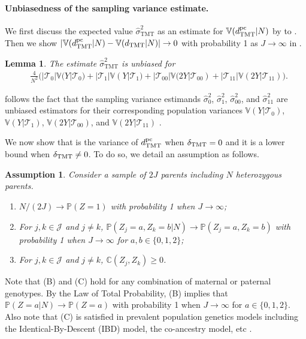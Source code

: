\documentclass[12pt]{extarticle}
\newtheorem{asm}{Assumption}%
\newtheorem{lem}{Lemma}%
\newcommand{\pp}{\mathbb{P}}
\newcommand{\nind}{J}
\newcommand{\tmt}{{\normalfont \text{TMT}}}
\newcommand{\dtmtpc}{d_{\tmt}^{\normalfont \text{pc}}}
\newcommand{\vtmthat}{\hat{\sigma}^2_{\text{TMT}}}
\newcommand{\V}{\mathbb{V}}
\newcommand{\cV}{\mathbb{C}}
\newcommand{\cJ}{\mathcal{J}}
\newcommand{\cT}{\mathcal{T}}
\begin{document}
{\paragraph{Unbiasedness of the sampling variance estimate.} 

We first discuss the expected value $\vtmthat$ as an estimate for $\V(\dtmtpc|N)$ by  to . Then we show $|\V(\dtmtpc|N) - \V(d_{\tmt}|N)|\to 0$ with probability 1 as $\nind \to \infty$ in .

\begin{lem}\label{lem:vir}
The estimate {\normalfont $\vtmthat$} is unbiased for 
\normalfont \begin{align} \label{eq:vir}
& \frac{4}{N^2}\Big(|\cT_0|\V(Y|\cT_0)+|\cT_1|\V(Y|\cT_1)+|\cT_{00}|\V(2Y|\cT_{00})+|\cT_{11}|\V(2Y|\cT_{11})\Big).
\end{align}
\end{lem}

\noindent {} follows the fact that the sampling variance estimands $\hat{\sigma}^2_0$, $\hat{\sigma}^2_1$, $\hat{\sigma}^2_{00}$, and $\hat{\sigma}^2_{11}$ are unbiased estimators for their corresponding population variances $\V(Y|\cT_{0})$, $\V(Y|\cT_{1})$, $\V(2Y|\cT_{00})$, and $\V(2Y|\cT_{11})$ \citep{imbens2015}. 

We now show that  is the variance of $\dtmtpc$ when $\delta_{\tmt} = 0$ and it is a lower bound when $\delta_{\tmt} \not= 0$. To do so, we detail an assumption as follows. 

\begin{asm} \label{asm:nj}
Consider a sample of $2\nind$ parents including $N$ heterozygous parents. \begin{enumerate}
\item[(A)] $N /(2J) \rightarrow \pp(Z=1)$ with probability 1 when $\nind \rightarrow \infty$;
\item[(B)] For $j, k \in \cJ$ and $j \not= k$, 
$\pp(Z_j=a,Z_k=b|N) \rightarrow \pp(Z_j=a,Z_k=b)$ with probability 1 when $\nind \rightarrow \infty$ for $a,b\in\{0,1,2\}$;
\item[(C)] For $j, k \in \cJ$ and $j \not= k$, $\cV(Z_j,Z_k)\geq 0$.
\end{enumerate}
\end{asm} 

\noindent Note that (B) and (C) hold for any combination of maternal or paternal genotypes. By the Law of Total Probability, (B) implies that $\pp(Z=a|N)\to \pp(Z=a)$ with probability 1 when $\nind \to \infty$ for $a\in \{0,1,2\}$. Also note that (C) is satisfied in prevalent population genetics models including the Identical-By-Descent (IBD) model, the co-ancestry model, etc \citep{ochoa2021}. 

}
\end{document}
